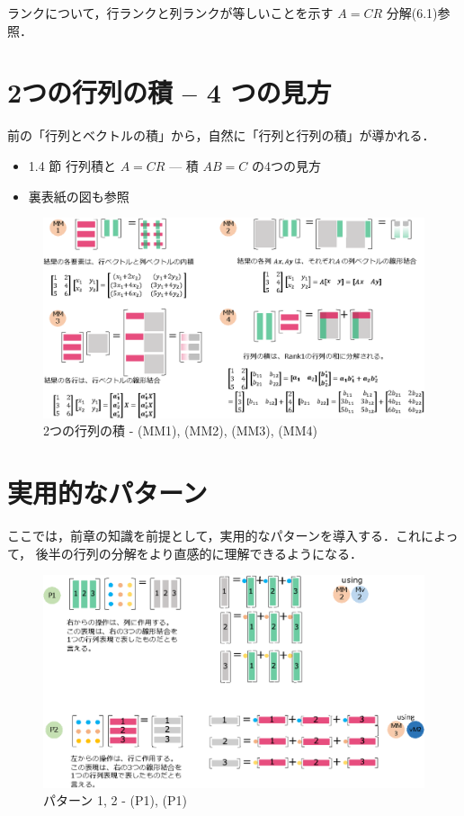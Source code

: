 \documentclass[letterpaper]{article}
\begin{document}
ランクについて，行ランクと列ランクが等しいことを示す $A=CR$ 分解(6.1)参照．

\clearpage

\section{2つの行列の積 -- 4 つの見方}

前の「行列とベクトルの積」から，自然に「行列と行列の積」が導かれる．

\begin{itemize}
  \item 1.4 節 行列積と $A=CR$ \; --- 積 $AB=C$ の4つの見方
  \item 裏表紙の図も参照
\end{itemize} 


\begin{figure}[H]
  \includegraphics[keepaspectratio, width=\linewidth]{MatrixTimesMatrix-j.eps}
  \caption{2つの行列の積 - (MM1), (MM2), (MM3), (MM4)}
\end{figure}

\clearpage


\section{実用的なパターン}

ここでは，前章の知識を前提として，実用的なパターンを導入する．これによって，
後半の行列の分解をより直感的に理解できるようになる．

\begin{figure}[H]
  \includegraphics[keepaspectratio, width=16cm]{Pattern12-j.eps}
  \caption{パターン 1, 2 - (P1), (P1)}
\end{figure}
\end{document}
